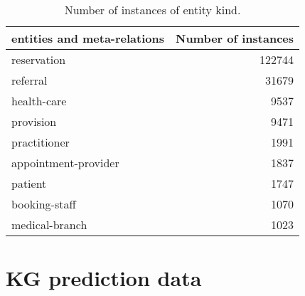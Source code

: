 \documentclass{article}
\begin{document}
\begin{table}[]
\centering
\begin{tabular}{lr}
\toprule
 entities and meta-relations &  Number of instances \\
\midrule
         reservation &           122744 \\
            referral &            31679 \\
         health-care &             9537 \\
           provision &             9471 \\
        practitioner &             1991 \\
appointment-provider &             1837 \\
             patient &             1747 \\
       booking-staff &             1070 \\
      medical-branch &             1023 \\
\bottomrule
\end{tabular}
\caption{Number of instances of entity kind.}
\label{table:entity}
\end{table}
\noindent

\section{KG prediction data}
\end{document}
